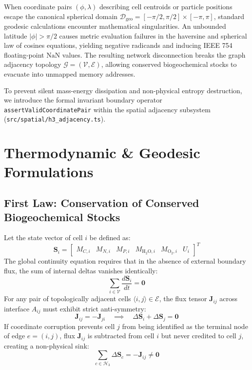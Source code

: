 \documentclass[11pt, a4paper]{article}
\begin{document}
When coordinate pairs $(\phi, \lambda)$ describing cell centroids or particle positions escape the canonical spherical domain $\mathcal{D}_{\text{geo}} = [-\pi/2, \pi/2] \times [-\pi, \pi]$, standard geodesic calculations encounter mathematical singularities. An unbounded latitude $|\phi| > \pi/2$ causes metric evaluation failures in the haversine and spherical law of cosines equations, yielding negative radicands and inducing IEEE 754 floating-point $\text{NaN}$ values. The resulting network disconnection breaks the graph adjacency topology $\mathcal{G} = (\mathcal{V}, \mathcal{E})$, allowing conserved biogeochemical stocks to evacuate into unmapped memory addresses.

To prevent silent mass-energy dissipation and non-physical entropy destruction, we introduce the formal invariant boundary operator \texttt{assertValidCoordinatePair} within the spatial adjacency subsystem (\texttt{src/spatial/h3\_adjacency.ts}).

\section{Thermodynamic \& Geodesic Formulations}

\subsection{First Law: Conservation of Conserved Biogeochemical Stocks}

Let the state vector of cell $i$ be defined as:
\begin{equation}
\mathbf{S}_i = \begin{bmatrix} M_{C, i} & M_{N, i} & M_{P, i} & M_{\text{H}_2\text{O}, i} & M_{\text{O}_2, i} & U_i \end{bmatrix}^T
\end{equation}
The global continuity equation requires that in the absence of external boundary flux, the sum of internal deltas vanishes identically:
\begin{equation}
\sum_{i \in \mathcal{V}} \frac{d \mathbf{S}_i}{dt} = \mathbf{0}
\end{equation}
For any pair of topologically adjacent cells $\langle i, j \rangle \in \mathcal{E}$, the flux tensor $\mathbf{J}_{ij}$ across interface $A_{ij}$ must exhibit strict anti-symmetry:
\begin{equation}
\mathbf{J}_{ij} = -\mathbf{J}_{ji} \quad \implies \quad \Delta \mathbf{S}_i + \Delta \mathbf{S}_j = \mathbf{0}
\end{equation}
If coordinate corruption prevents cell $j$ from being identified as the terminal node of edge $e = (i, j)$, flux $\mathbf{J}_{ij}$ is subtracted from cell $i$ but never credited to cell $j$, creating a non-physical sink:
\begin{equation}
\sum_{c \in \mathcal{H}_3} \Delta \mathbf{S}_c = -\mathbf{J}_{ij} \neq \mathbf{0}
\end{equation}
\end{document}
